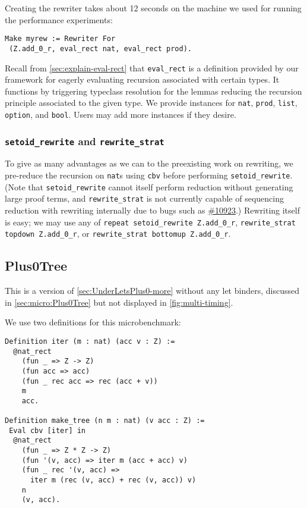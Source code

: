\documentclass[sigplan,10pt,review,anonymous]{acmart}\settopmatter{printfolios=true,printccs=false,printacmref=false}
\newcommand{\coqbug}[1]{\href{https://github.com/coq/coq/issues/#1}{\##1}}
\begin{document}
Creating the rewriter takes about 12 seconds on the machine we used for running the performance experiments:
\begin{verbatim}
Make myrew := Rewriter For
 (Z.add_0_r, eval_rect nat, eval_rect prod).
\end{verbatim}
Recall from \autoref{sec:explain-eval-rect} that \texttt{eval_rect} is a definition provided by our framework for eagerly evaluating recursion associated with certain types.
It functions by triggering typeclass resolution for the lemmas reducing the recursion principle associated to the given type.
We provide instances for \texttt{nat}, \texttt{prod}, \texttt{list}, \texttt{option}, and \texttt{bool}.
Users may add more instances if they desire.

\subsubsection{\texorpdfstring{\texttt{setoid\_rewrite}}{setoid\_rewrite} and \texorpdfstring{\texttt{rewrite\_strat}}{rewrite\_strat}}
To give as many advantages as we can to the preexisting work on rewriting, we pre-reduce the recursion on \texttt{nat}s using \texttt{cbv} before performing \texttt{setoid\_rewrite}.
(Note that \texttt{setoid\_rewrite} cannot itself perform reduction without generating large proof terms, and \texttt{rewrite\_strat} is not currently capable of sequencing reduction with rewriting internally due to bugs such as \coqbug{10923}.)
Rewriting itself is easy; we may use any of \texttt{repeat setoid\_rewrite Z.add\_0\_r}, \texttt{rewrite\_strat topdown Z.add\_0\_r}, or \texttt{rewrite\_strat bottomup Z.add\_0\_r}.

\subsection{Plus0Tree} \label{sec:Plus0Tree-more}

This is a version of \autoref{sec:UnderLetsPlus0-more} without any let binders, discussed in \autoref{sec:micro:Plus0Tree} but not displayed in \autoref{fig:multi-timing}.

We use two definitions for this microbenchmark:
\begin{verbatim}
Definition iter (m : nat) (acc v : Z) :=
  @nat_rect
    (fun _ => Z -> Z)
    (fun acc => acc)
    (fun _ rec acc => rec (acc + v))
    m
    acc.

Definition make_tree (n m : nat) (v acc : Z) :=
 Eval cbv [iter] in
  @nat_rect
    (fun _ => Z * Z -> Z)
    (fun '(v, acc) => iter m (acc + acc) v)
    (fun _ rec '(v, acc) =>
      iter m (rec (v, acc) + rec (v, acc)) v)
    n
    (v, acc).
\end{verbatim}
\end{document}
